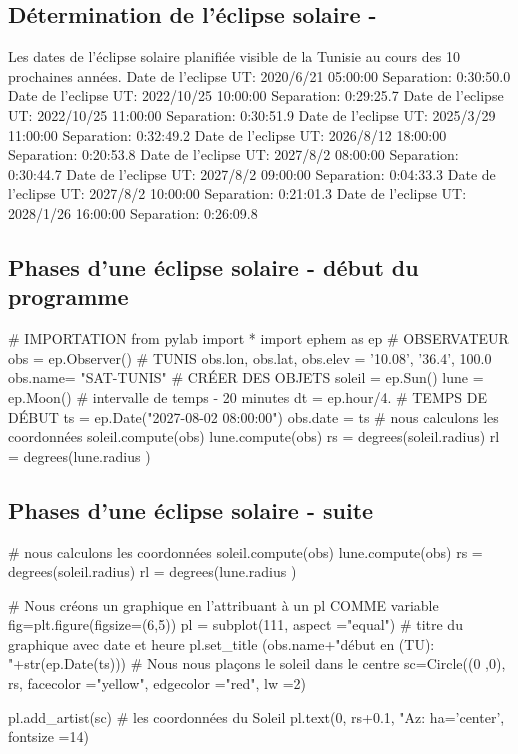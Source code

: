 \documentclass[%
oneside,                 %
final,                   %
10pt]{article}
\begin{document}
\subsection{Détermination de l'éclipse solaire -}
Les dates de l'éclipse solaire planifiée visible de la Tunisie au cours des 10 prochaines années.
\bccq
Date de l'eclipse UT:  2020/6/21 05:00:00 Separation:  0:30:50.0
Date de l'eclipse UT:  2022/10/25 10:00:00 Separation:  0:29:25.7
Date de l'eclipse UT:  2022/10/25 11:00:00 Separation:  0:30:51.9
Date de l'eclipse UT:  2025/3/29 11:00:00 Separation:  0:32:49.2
Date de l'eclipse UT:  2026/8/12 18:00:00 Separation:  0:20:53.8
Date de l'eclipse UT:  2027/8/2 08:00:00 Separation:  0:30:44.7
Date de l'eclipse UT:  2027/8/2 09:00:00 Separation:  0:04:33.3
Date de l'eclipse UT:  2027/8/2 10:00:00 Separation:  0:21:01.3
Date de l'eclipse UT:  2028/1/26 16:00:00 Separation:  0:26:09.8
\eccq
\subsection{Phases d'une éclipse solaire - début du programme}
\bpycod
# IMPORTATION
from pylab import *
import ephem as ep
# OBSERVATEUR
obs = ep.Observer()
# TUNIS
obs.lon, obs.lat, obs.elev = '10.08', '36.4', 100.0
obs.name= "SAT-TUNIS"
# CRÉER DES OBJETS
soleil = ep.Sun()
lune = ep.Moon()
# intervalle de temps - 20 minutes
dt = ep.hour/4.
# TEMPS DE DÉBUT
ts = ep.Date("2027-08-02 08:00:00")
obs.date = ts
# nous calculons les coordonnées
soleil.compute(obs)
lune.compute(obs)
rs = degrees(soleil.radius)
rl = degrees(lune.radius )
\epycod

\subsection{Phases d'une éclipse solaire - suite}

\bpycod
# nous calculons les coordonnées
soleil.compute(obs)
lune.compute(obs)
rs = degrees(soleil.radius)
rl = degrees(lune.radius )

# Nous créons un graphique en l'attribuant à un pl COMME variable
fig=plt.figure(figsize=(6,5))
pl = subplot(111, aspect ="equal")
# titre du graphique avec date et heure
pl.set_title (obs.name+"\n début en (TU): "+str(ep.Date(ts)))
# Nous nous plaçons le soleil dans le centre
sc=Circle((0 ,0), rs, facecolor ="yellow",
            edgecolor ="red", lw =2)

pl.add_artist(sc)
# les coordonnées du Soleil
pl.text(0, rs+0.1, "Az: %
        ha='center', fontsize =14)
\epycod
\end{document}
